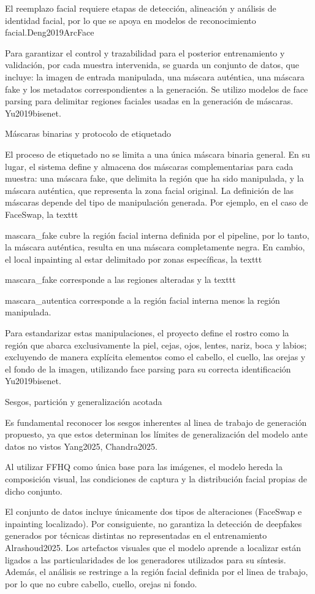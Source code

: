 El reemplazo facial requiere etapas de detección, alineación y análisis de identidad facial, por lo que se apoya en modelos de reconocimiento facial.Deng2019ArcFace

Para garantizar el control y trazabilidad para el posterior entrenamiento y validación, por cada muestra intervenida, se guarda un conjunto de datos, que incluye: la imagen de entrada manipulada, una máscara auténtica, una máscara fake y los metadatos correspondientes a la generación. Se utilizo  modelos de face parsing para delimitar regiones faciales usadas en la generación de máscaras. Yu2019bisenet.

Máscaras binarias y protocolo de etiquetado

El proceso de etiquetado no se limita a una única máscara binaria general. En su lugar, el sistema define y almacena dos máscaras complementarias para cada muestra: una máscara fake, que delimita la región que ha sido manipulada, y la máscara auténtica, que representa la zona facial original. La definición de las máscaras depende del tipo de manipulación generada. Por ejemplo, en el caso de FaceSwap, la texttt{mascara_fake cubre la región facial interna definida por el pipeline, por lo tanto, la máscara auténtica, resulta en una máscara completamente negra. En cambio, el local inpainting al estar delimitado por zonas específicas, la texttt{mascara_fake corresponde a las regiones alteradas y la texttt{mascara_autentica corresponde a la región facial interna menos la región manipulada.

Para estandarizar estas manipulaciones, el proyecto define el rostro como la región que abarca exclusivamente la piel, cejas, ojos, lentes, nariz, boca y labios; excluyendo de manera explícita elementos como el cabello, el cuello, las orejas y el fondo de la imagen, utilizando face parsing para su correcta identificación Yu2019bisenet.


Sesgos, partición y generalización acotada

Es fundamental reconocer los sesgos inherentes al linea de trabajo de generación propuesto, ya que estos determinan los límites de generalización del modelo ante datos no vistos Yang2025, Chandra2025. 

Al utilizar FFHQ como única base para las imágenes, el modelo hereda la composición visual, las condiciones de captura y la distribución facial propias de dicho conjunto.

El conjunto de datos incluye únicamente dos tipos de alteraciones (FaceSwap e inpainting localizado). Por consiguiente, no garantiza la detección de deepfakes generados por técnicas distintas no representadas en el entrenamiento Alrashoud2025. Los artefactos visuales que el modelo aprende a localizar están ligados a las particularidades de los generadores utilizados para su síntesis. Además, el análisis se restringe a la región facial definida por el linea de trabajo, por lo que no cubre cabello, cuello, orejas ni fondo.

}}}
